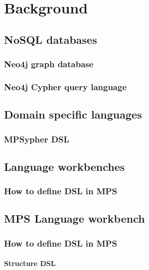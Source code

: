 \chapter{Background}

\section{NoSQL databases}

	\subsection{Neo4j graph database}

	\subsection{Neo4j Cypher query language}
	

\section{Domain specific languages}

	\subsection{MPSypher DSL}



\section{Language workbenches}

	\subsection{How to define DSL in MPS}



\section{MPS Language workbench}

	\subsection{How to define DSL in MPS}

		\subsubsection{Structure DSL}

